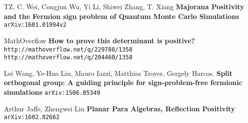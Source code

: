 \documentclass[12pt]{article}
\begin{document}
\begin{thebibliography}{}

\item TZ. C. Wei, Congjun Wu, Yi Li, Shiwei Zhang, T. Xiang \textbf{Majorana Positivity and the Fermion sign problem of Quantum Monte Carlo Simulations} \texttt{ arXiv:1601.01994v2}

\item MathOverflow \textbf{How to prove this determinant is positive?}  \\ \texttt{http://mathoverflow.net/q/229788/1358} \\ \texttt{http://mathoverflow.net/q/204460/1358}

\item Lei Wang, Ye-Hua Liu, Mauro Iazzi, Matthias Troyer, Gergely Harcos. \textbf{Split orthogonal group: A guiding principle for sign-problem-free fermionic simulations}
\texttt{arXiv:1506.05349}

\item Arthur Jaffe, Zhengwei Liu \textbf{Planar Para Algebras, Reflection Positivity} \texttt{arXiv:1602.02662} 

\end{thebibliography}
\end{document}

